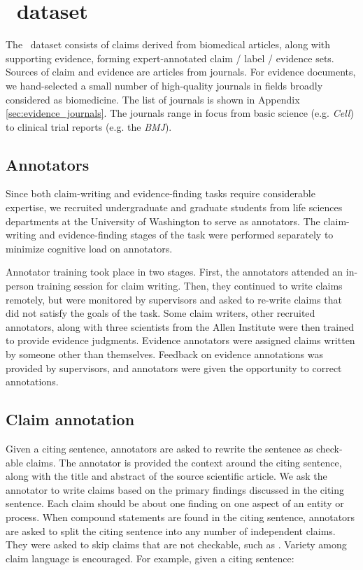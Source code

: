 \section{\ours\ dataset} \label{sec:dataset}

The \ours\ dataset consists of \numclaims claims derived from \numpapers biomedical articles, along with supporting evidence, forming \todo expert-annotated claim / label / evidence sets. Sources of claim and evidence are articles from \todo journals. For evidence documents, we hand-selected a small number of high-quality journals in fields broadly considered as biomedicine. The list of journals is shown in Appendix \ref{sec:evidence_journals}. The journals range in focus from basic science (e.g. \emph{Cell}) to clinical trial reports (e.g. the \emph{BMJ}). 

\subsection{Annotators}

Since both claim-writing and evidence-finding tasks require considerable expertise, we recruited undergraduate and graduate students from life sciences departments at the University of Washington to serve as annotators. The claim-writing and evidence-finding stages of the task were performed separately to minimize cognitive load on annotators.

Annotator training took place in two stages. First, the annotators attended an in-person training session for claim writing. Then, they continued to write claims remotely, but were monitored by supervisors and asked to re-write claims that did not satisfy the goals of the task. Some claim writers, other recruited annotators, along with three scientists from the Allen Institute were then trained to provide evidence judgments. Evidence annotators were assigned claims written by someone other than themselves.  Feedback on evidence annotations was provided by supervisors, and annotators were given the opportunity to correct annotations.

\subsection{Claim annotation}


Given a citing sentence, annotators are asked to rewrite the sentence as check-able claims. The annotator is provided the context around the citing sentence, along with the title and abstract of the source scientific article. We ask the annotator to write claims based on the primary findings discussed in the citing sentence. Each claim should be about one finding on one aspect of an entity or process. When compound statements are found in the citing sentence, annotators are asked to split the citing sentence into any number of independent claims. They were asked to skip claims that are not checkable, such as . Variety among claim language is encouraged. For example, given a citing sentence:

